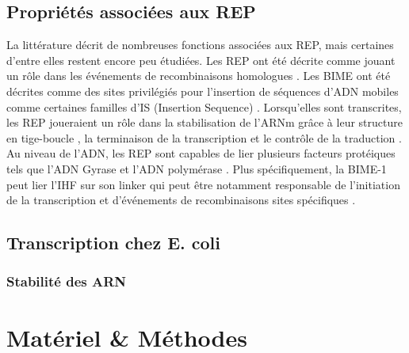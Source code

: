 \documentclass[12pt,a4paper]{report}
\begin{document}
\begin{onehalfspace}
\section*{Propriétés associées aux REP}
La littérature décrit de nombreuses fonctions associées aux REP, mais certaines d'entre elles restent encore peu étudiées. Les REP ont été décrite comme jouant un rôle dans les événements de recombinaisons homologues \citep{Kofoid2003}. Les BIME ont été décrites comme des sites privilégiés pour l'insertion de séquences d'ADN mobiles comme certaines familles d'IS (Insertion Sequence) \citep{Bachellier1997,Clement1999,Choi2003,Tobes2005}. Lorsqu'elles sont transcrites, les REP joueraient un rôle dans la stabilisation de l'ARNm grâce à leur structure en tige-boucle \citep{Newbury1987,Espeli2001,Khemici2004,Aguena2009}, la terminaison de la transcription \citep{Gilson1986} et le contrôle de la traduction \citep{Stern1988}. Au niveau de l'ADN, les REP sont capables de lier plusieurs facteurs protéiques tels que l'ADN Gyrase \citep{Espeli1997} et l'ADN polymérase \citep{Gilson1990}. Plus spécifiquement, la BIME-1 peut lier l'IHF sur son linker \citep{Boccard1993} qui peut être notamment responsable de l'initiation de la transcription et d’événements de recombinaisons sites spécifiques \citep{Goosen1995}.

\section*{Transcription chez E. coli}

\subsection*{Stabilité des ARN}

\chapter*{Matériel \& Méthodes}


\end{onehalfspace}
\end{document}
